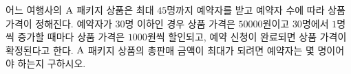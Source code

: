 어느 여행사의 $\mathrm{A}$ 패키지 상품은 최대 $45$명까지 예약자를 받고 예약자 수에 따라 상품 가격이 정해진다. 예약자가 $30$명 이하인 경우 상품 가격은 $50000$원이고 $30$명에서 $1$명씩 증가할 때마다 상품 가격은 $1000$원씩 할인되고, 예약 신청이 완료되면 상품 가격이 확정된다고 한다. $\mathrm{A}$ 패키지 상품의 총판매 금액이 최대가 되려면 예약자는 몇 명이어야 하는지 구하시오.
